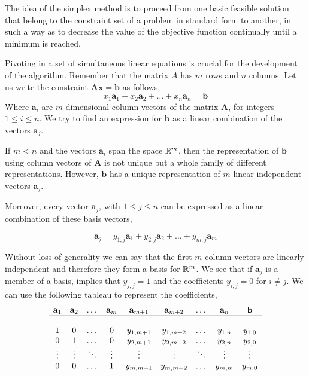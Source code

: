 The idea of the simplex method is to proceed from one basic feasible solution that belong to the constraint set of a problem in standard form to another, in such a way as to decrease the value of the objective function continually until a minimum is reached. 

Pivoting in a set of simultaneous linear equations is crucial for the development of the algorithm. Remember that the matrix $A$ has $m$ rows and $n$ columns. Let us write the constraint $\mathbf{Ax}=\mathbf{b}$ as follows,
\begin{equation*}
x_1\mathbf{a}_1+x_2\mathbf{a}_2+\dots+x_n\mathbf{a}_n=\mathbf{b}
\end{equation*}
Where $\mathbf{a}_i$ are $m$-dimensional column vectors of the matrix $\mathbf{A}$, for integers $1\leq i\leq n$. We try to find an expression for $\mathbf{b}$ as a linear combination of the vectors $\mathbf{a}_j$. 

If $m<n$ and the vectors $\mathbf{a}_i$ span the space $\mathbb{R}^m$, then the representation of $\mathbf{b}$ using column vectors of $\mathbf{A}$ is not unique but a whole family of different representations. However, $\mathbf{b}$ has a unique representation of $m$ linear independent vectors $\mathbf{a}_j$. 

Moreover, every vector $\mathbf{a}_j$, with $1\leq j \leq n$ can be expressed as a linear combination of these basis vectors,

\begin{equation*}
	\mathbf{a}_j= y_{1,j}\mathbf{a}_1+y_{2,j}\mathbf{a}_2+\dots+y_{m,j}\mathbf{a}_{m}
\end{equation*}




Without loss of generality we can say that the first $m$ column vectors are linearly independent and therefore they form a basis for $\mathbb{R} ^m$. We see that if $\mathbf{a}_j$ is a member of a basis, implies that $y_{j,j}=1$ and the coefficients $y_{i,j}=0$ for $i\neq j$. We can use the following tableau to represent the coefficients,  
\begin{equation}
	\begin{array}{ccccccccc}
	\mathbf{a}_1 & \mathbf{a}_2 &\dots &\mathbf{a}_m & \mathbf{a}_{m+1}& \mathbf{a}_{m+2} &\dots &\mathbf{a}_n & \mathbf{b}\\
	\hline\\
	1 &0&\dots&0 & y_{1,m+1} & y_{1, m+2} &\dots & y_{1, n} & y_{1,0} \\
	0 &1&\dots&0 & y_{2,m+1} & y_{2, m+2} &\dots & y_{2, n} & y_{2,0} \\
	\vdots &\vdots&\ddots &\vdots&\vdots & \vdots & \ddots & \vdots & \vdots \\
	0 & 0 & \dots & 1 & y_{m, m+1}& y_{m,m+2} &\dots & y_{m,m} & y_{m, 0}
	\end{array}\label{eq: Linear Programming tableau}
\end{equation}

